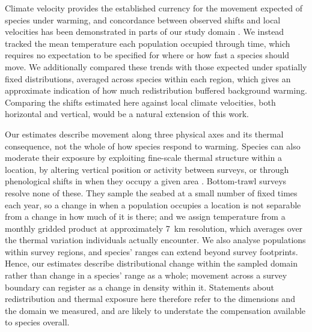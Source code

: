 \documentclass[9pt,twocolumn,twoside]{pnas-new}
\begin{document}
Climate velocity provides the established currency for the movement expected of species under warming, and concordance between observed shifts and local velocities has been demonstrated in parts of our study domain \citep{burrows_pace_2011, pinsky_marine_2013, englishContrastingClimateVelocity2022, gruenburgVerticalClimateVelocity2025}. We instead tracked the mean temperature each population occupied through time, which requires no expectation to be specified for where or how fast a species should move. We additionally compared these trends with those expected under spatially fixed distributions, averaged across species within each region, which gives an approximate indication of how much redistribution buffered background warming. Comparing the shifts estimated here against local climate velocities, both horizontal and vertical, would be a natural extension of this work.

Our estimates describe movement along three physical axes and its thermal consequence, not the whole of how species respond to warming. Species can also moderate their exposure by exploiting fine-scale thermal structure within a location, by altering vertical position or activity between surveys, or through phenological shifts in when they occupy a given area \citep{lawlor_mechanisms_2024, fredston_reimagining_2025, neate-cleggAdvancesBreedingPhenology2024}. Bottom-trawl surveys resolve none of these. They sample the seabed at a small number of fixed times each year, so a change in when a population occupies a location is not separable from a change in how much of it is there; and we assign temperature from a monthly gridded product at approximately 7~km resolution, which averages over the thermal variation individuals actually encounter. We also analyse populations within survey regions, and species' ranges can extend beyond survey footprints. Hence, our estimates describe distributional change within the sampled domain rather than change in a species' range as a whole; movement across a survey boundary can register as a change in density within it. Statements about redistribution and thermal exposure here therefore refer to the dimensions and the domain we measured, and are likely to understate the compensation available to species overall.
\end{document}
